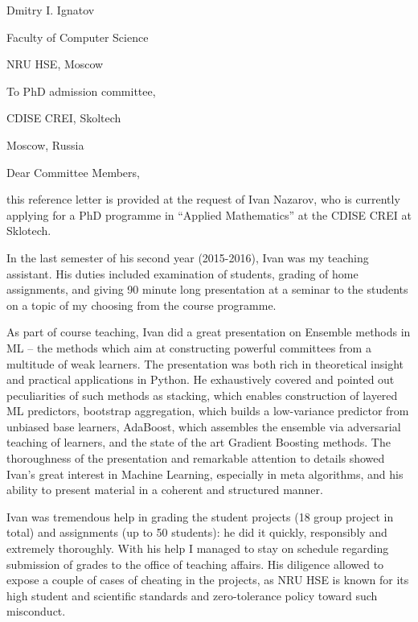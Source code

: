 \documentclass[14pt]{extarticle}
\begin{document}
\hspace*{0.55\linewidth}
\begin{minipage}{0.45\linewidth}
Dmitry I. Ignatov \par
Faculty of Computer Science \par
NRU HSE, Moscow
\end{minipage}\par \bigskip

\begin{minipage}{0.5\linewidth}
To PhD admission committee, \par
CDISE CREI, Skoltech \par
Moscow, Russia \par
\end{minipage} \par\bigskip

Dear Committee Members, \par\bigskip

this reference letter is provided at the request of Ivan Nazarov, who is currently
applying for a PhD programme in ``Applied Mathematics'' at the CDISE CREI at Sklotech.
\par\medskip

In the last semester of his second year (2015-2016), Ivan was my teaching assistant.
His duties included examination of students, grading of home assignments, and giving
90 minute long presentation at a seminar to the students on a topic of my choosing
from the course programme. \par\medskip

As part of course teaching, Ivan did a great presentation on Ensemble methods in ML
-- the methods which aim at constructing powerful committees from a multitude of weak
learners. The presentation was both rich in theoretical insight and practical applications
in Python. He exhaustively covered and pointed out peculiarities of such methods as
stacking, which enables construction of layered ML predictors, bootstrap aggregation,
which builds a low-variance predictor from unbiased base learners, AdaBoost, which
assembles the ensemble via adversarial teaching of learners, and the state of the
art Gradient Boosting methods. The thoroughness of the presentation and remarkable
attention to details showed Ivan's great interest in Machine Learning, especially
in meta algorithms, and his ability to present material in a coherent and structured
manner. \par\medskip

Ivan was tremendous help in grading the student projects (18 group project in total)
and assignments (up to 50 students): he did it quickly, responsibly and extremely
thoroughly. With his help I managed to stay on schedule regarding submission of grades
to the office of teaching affairs. His diligence allowed to expose a couple of cases
of cheating in the projects, as NRU HSE is known for its high student and scientific
standards and zero-tolerance policy toward such misconduct. \par\medskip
\end{document}
